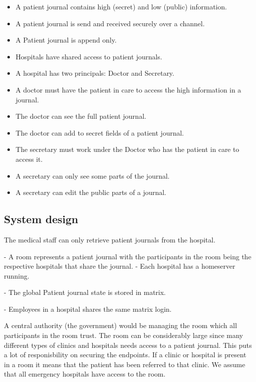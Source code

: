 \begin{itemize}
	\item A patient journal contains high (secret) and low (public) information.
	\item A patient journal is send and received securely over a channel.
	\item A Patient journal is append only. 
	\item Hospitals have shared access to patient journals. 
	\item A hospital has two principals: Doctor and Secretary.
	\item A doctor must have the patient in care to access the high information in a journal.
	\item The doctor can see the full patient journal.
	\item The doctor can add to secret fields of a patient journal.
	\item The secretary must work under the Doctor who has the patient in care to access it.
	\item A secretary can only see some parts of the journal.
	\item A secretary can edit the public parts of a journal.
\end{itemize}








\subsection{System design}

The medical staff can only retrieve patient journals from the hospital.

- A room represents a patient journal with the participants in the room being the respective hospitals that share the journal. 
- Each hospital has a homeserver running.

- The global Patient journal state is stored in matrix.

- Employees in a hospital shares the same matrix login.

A central authority (the government) would be managing the room which all participants in the room trust. The room can be considerably large since many different types of clinics and hospitals needs access to a patient journal. This puts a lot of responisbility on securing the endpoints. If a clinic or hospital is present in a room it means that the patient has been referred to that clinic. We assume that all emergency hospitals have access to the room.


